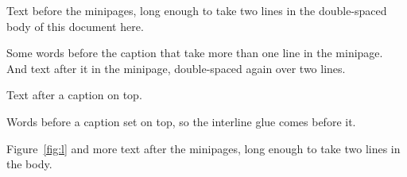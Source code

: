 \documentclass{article}
\begin{document}
Text before the minipages, long enough to take two lines in the double-spaced body of this document here.

\noindent\begin{minipage}{0.45\textwidth}
Some words before the caption that take more than one line in the minipage.
\label{fig:l}
And text after it in the minipage, double-spaced again over two lines.
\end{minipage}\hfill
\begin{minipage}{0.45\textwidth}
\centering
{}
Text after a caption on top.
\end{minipage}

\noindent\begin{minipage}{0.6\textwidth}
\captionsetup{position=top}
Words before a caption set on top, so the interline glue comes before it.
\end{minipage}

Figure~\ref{fig:l} and more text after the minipages, long enough to take two lines in the body.
\end{document}
